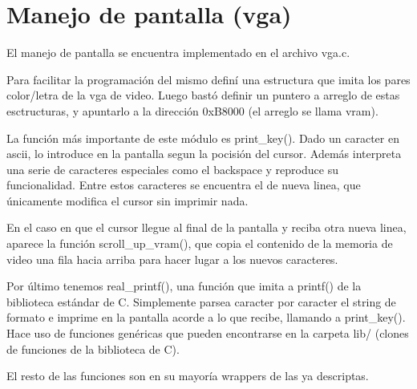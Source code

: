 \section{Manejo de pantalla (vga)}

El manejo de pantalla se encuentra implementado en el archivo vga.c.

Para facilitar la programación del mismo definí una estructura que imita los
pares color/letra de la vga de video. Luego bastó definir un puntero a arreglo
de estas esctructuras, y apuntarlo a la dirección 0xB8000 (el arreglo se llama
vram).

La función más importante de este módulo es print\_key(). Dado un caracter en
ascii, lo introduce en la pantalla segun la pocisión del cursor. Además
interpreta una serie de caracteres especiales como el backspace y reproduce su
funcionalidad. Entre estos caracteres se encuentra el de nueva linea, que
únicamente modifica el cursor sin imprimir nada.

En el caso en que el cursor llegue al final de la pantalla y reciba otra nueva
linea, aparece la función scroll\_up\_vram(), que copia el contenido de la
memoria de video una fila hacia arriba para hacer lugar a los nuevos
caracteres.

Por último tenemos real\_printf(), una función que imita a printf() de la
biblioteca estándar de C. Simplemente parsea caracter por caracter el string de
formato e imprime en la pantalla acorde a lo que recibe, llamando a
print\_key(). Hace uso de funciones genéricas que pueden encontrarse en la
carpeta lib/ (clones de funciones de la biblioteca de C).

El resto de las funciones son en su mayoría wrappers de las ya descriptas.
